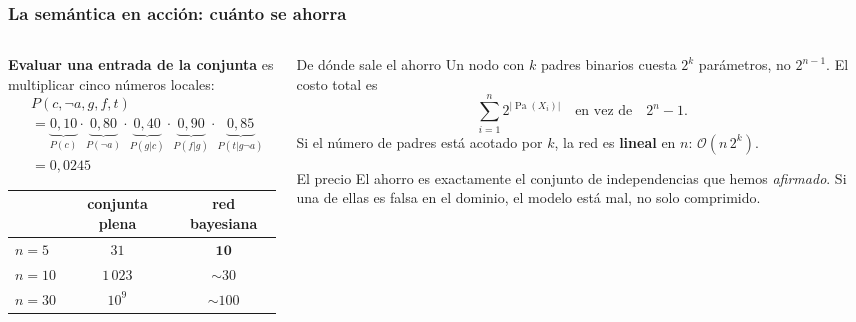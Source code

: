 \documentclass[aspectratio=169, 10pt]{beamer}
\providecommand{\Pa}{\operatorname{Pa}}
\begin{document}
\begin{frame}
\frametitle{La semántica en acción: cuánto se ahorra}
\begin{columns}[T]
\begin{column}{6.2cm}
\textbf{Evaluar una entrada de la conjunta} es multiplicar cinco números locales:
\vspace{-0.2em}
{\footnotesize
\begin{align*}
&P(c,\lnot a, g, f, t) \\[2pt]
&= \underbrace{0{,}10}_{P(c)}\cdot \underbrace{0{,}80}_{P(\lnot a)}\cdot \underbrace{0{,}40}_{P(g|c)}\cdot \underbrace{0{,}90}_{P(f|g)}\cdot \underbrace{0{,}85}_{P(t|g\lnot a)}\\[2pt]
&= 0{,}0245
\end{align*}}
\vspace{-0.6em}
\begin{center}
\scriptsize
\begin{tabular}{@{}lcc@{}}
\toprule
 & \textbf{conjunta plena} & \textbf{red bayesiana}\\
\midrule
$n=5$   & $31$      & $\mathbf{10}$\\
$n=10$  & $1\,023$  & $\sim\!30$\\
$n=30$  & $10^{9}$  & $\sim\!100$\\
\bottomrule
\end{tabular}
\end{center}
\end{column}
\begin{column}{6.0cm}
\begin{block}{De dónde sale el ahorro}
\footnotesize
Un nodo con $k$ padres binarios cuesta $2^{k}$ parámetros, no $2^{n-1}$. El costo total es
\[
\sum_{i=1}^{n} 2^{|\Pa(X_i)|}
\quad\text{en vez de}\quad 2^{n}-1 .
\]
Si el número de padres está acotado por $k$, la red es \textbf{lineal} en $n$: $\mathcal{O}(n\,2^{k})$.
\end{block}
\vspace{-0.2em}
\begin{alertblock}{El precio}
\footnotesize
El ahorro es exactamente el conjunto de independencias que hemos \emph{afirmado}. Si una de ellas es falsa en el dominio, el modelo está mal, no solo comprimido.
\end{alertblock}
\end{column}
\end{columns}
\end{frame}
\end{document}
